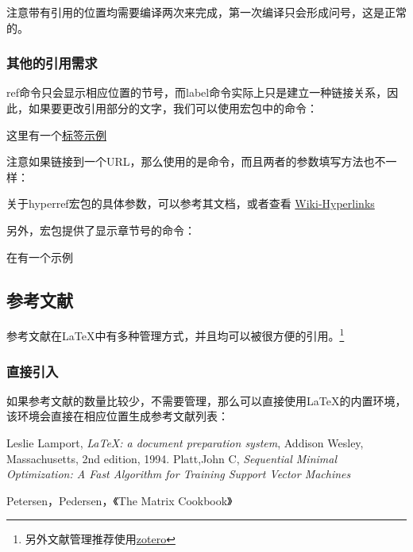    注意带有引用的位置均需要编译两次来完成，第一次编译只会形成问号，这是正常的。
    \subsubsection{其他的引用需求}
    ref命令只会显示相应位置的节号，而label命令实际上只是建立一种链接关系，因此，如果要更改引用部分的文字，我们可以使用宏包中的命令：
    \begin{texshow}
        这里有一个\hyperref[ex:标签示例]{标签示例}
    \end{texshow}
    注意如果链接到一个URL，那么使用的是命令，而且两者的参数填写方法也不一样：
    \begin{texshow}
        关于hyperref宏包的具体参数，可以参考其文档，或者查看
        \href{https://en.wikibooks.org/wiki/LaTeX/Hyperlinks}
        {Wiki-Hyperlinks}
    \end{texshow}

    另外，宏包提供了显示章节号的命令：
    \begin{texshow}
        在有一个示例
    \end{texshow}

    \subsection{参考文献}
    参考文献在\LaTeX{}中有多种管理方式，并且均可以被很方便的引用。\footnote{另外文献管理推荐使用\href{http://zotero.org}{zotero}}

    \subsubsection{直接引入}
    如果参考文献的数量比较少，不需要管理，那么可以直接使用\LaTeX{}的内置环境，该环境会直接在相应位置生成参考文献列表：
    \begin{texshow}
        \begin{thebibliography}{9}
              Leslie Lamport,
              \textit{\LaTeX: a document preparation system},
              Addison Wesley, Massachusetts,
              2nd edition,
              1994.
                Platt,John C,
                \textit{Sequential Minimal Optimization: A Fast Algorithm for Training Support Vector Machines}
        \end{thebibliography}

        \begin{thebibliography}{1}
                Petersen，Pedersen，《The Matrix Cookbook》
        \end{thebibliography}
        
    \end{texshow}

